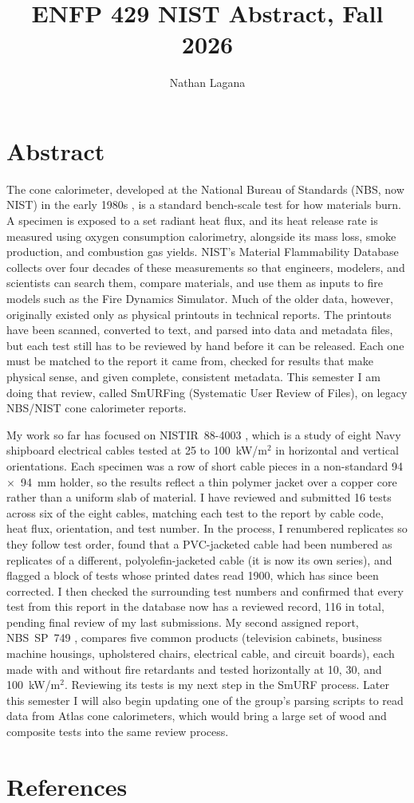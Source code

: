 \documentclass{abstract}
\title{ENFP 429 NIST Abstract, Fall 2026}
\author{Nathan Lagana}
\begin{document}
\maketitle
\section{Abstract}
The cone calorimeter, developed at the National Bureau of Standards (NBS, now NIST) in the early 1980s \cite{babrauskas1982development}, is a standard bench-scale test for how materials burn. A specimen is exposed to a set radiant heat flux, and its heat release rate is measured using oxygen consumption calorimetry, alongside its mass loss, smoke production, and combustion gas yields. NIST's Material Flammability Database collects over four decades of these measurements so that engineers, modelers, and scientists can search them, compare materials, and use them as inputs to fire models such as the Fire Dynamics Simulator. Much of the older data, however, originally existed only as physical printouts in technical reports. The printouts have been scanned, converted to text, and parsed into data and metadata files, but each test still has to be reviewed by hand before it can be released. Each one must be matched to the report it came from, checked for results that make physical sense, and given complete, consistent metadata. This semester I am doing that review, called SmURFing (Systematic User Review of Files), on legacy NBS/NIST cone calorimeter reports.

My work so far has focused on NISTIR~88-4003 \cite{emil1989flammability}, which is a study of eight Navy shipboard electrical cables tested at 25 to 100~kW/m$^2$ in horizontal and vertical orientations. Each specimen was a row of short cable pieces in a non-standard 94~$\times$~94~mm holder, so the results reflect a thin polymer jacket over a copper core rather than a uniform slab of material. I have reviewed and submitted 16 tests across six of the eight cables, matching each test to the report by cable code, heat flux, orientation, and test number. In the process, I renumbered replicates so they follow test order, found that a PVC-jacketed cable had been numbered as replicates of a different, polyolefin-jacketed cable (it is now its own series), and flagged a block of tests whose printed dates read 1900, which has since been corrected. I then checked the surrounding test numbers and confirmed that every test from this report in the database now has a reviewed record, 116 in total, pending final review of my last submissions. My second assigned report, NBS~SP~749 \cite{babrauskas1988fire}, compares five common products (television cabinets, business machine housings, upholstered chairs, electrical cable, and circuit boards), each made with and without fire retardants and tested horizontally at 10, 30, and 100~kW/m$^2$. Reviewing its tests is my next step in the SmURF process. Later this semester I will also begin updating one of the group's parsing scripts to read data from Atlas cone calorimeters, which would bring a large set of wood and composite tests into the same review process.

\section{References}
\printbibliography[heading=none]
\end{document}
